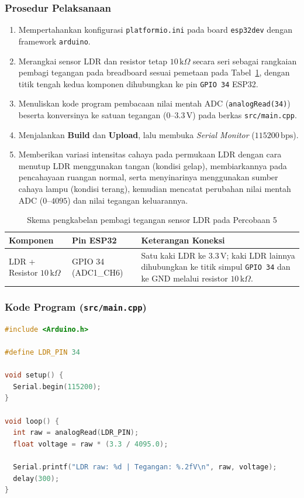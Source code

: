 \subsubsection*{Prosedur Pelaksanaan}
\begin{enumerate}[label=\arabic*.]
    \item Mempertahankan konfigurasi \texttt{platformio.ini} pada board \texttt{esp32dev} dengan framework \texttt{arduino}.
    \item Merangkai sensor LDR dan resistor tetap $10\,\text{k}\Omega$ secara seri sebagai rangkaian pembagi tegangan pada breadboard sesuai pemetaan pada Tabel~\ref{tab:wiring_ldr}, dengan titik tengah kedua komponen dihubungkan ke pin \texttt{GPIO 34} ESP32.
    \item Menuliskan kode program pembacaan nilai mentah ADC (\texttt{analogRead(34)}) beserta konversinya ke satuan tegangan ($0\text{--}3.3\,\text{V}$) pada berkas \texttt{src/main.cpp}.
    \item Menjalankan \textbf{Build} dan \textbf{Upload}, lalu membuka \textit{Serial Monitor} ($115200\,\text{bps}$).
    \item Memberikan variasi intensitas cahaya pada permukaan LDR dengan cara menutup LDR menggunakan tangan (kondisi gelap), membiarkannya pada pencahayaan ruangan normal, serta menyinarinya menggunakan sumber cahaya lampu (kondisi terang), kemudian mencatat perubahan nilai mentah ADC ($0\text{--}4095$) dan nilai tegangan keluarannya.
\end{enumerate}

\begin{table}[htbp]
    \centering
    \caption{Skema pengkabelan pembagi tegangan sensor LDR pada Percobaan 5}
    \label{tab:wiring_ldr}
    \begin{tabularx}{\textwidth}{l l X}
        \toprule
        \textbf{Komponen} & \textbf{Pin ESP32} & \textbf{Keterangan Koneksi} \\
        \midrule
        LDR + Resistor $10\,\text{k}\Omega$ & GPIO 34 (ADC1\_CH6) & Satu kaki LDR ke $3.3\,\text{V}$; kaki LDR lainnya dihubungkan ke titik simpul \texttt{GPIO 34} dan ke GND melalui resistor $10\,\text{k}\Omega$. \\
        \bottomrule
    \end{tabularx}
\end{table}

\subsubsection*{Kode Program (\texttt{src/main.cpp})}
\begin{lstlisting}[language=C++]
#include <Arduino.h>

#define LDR_PIN 34

void setup() {
  Serial.begin(115200);
}

void loop() {
  int raw = analogRead(LDR_PIN);
  float voltage = raw * (3.3 / 4095.0);

  Serial.printf("LDR raw: %d | Tegangan: %.2fV\n", raw, voltage);
  delay(300);
}
\end{lstlisting}


